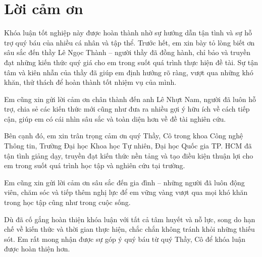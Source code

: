 \chapter*{Lời cảm ơn}
\label{thanks}

Khóa luận tốt nghiệp này được hoàn thành nhờ sự hướng dẫn tận tình và sự hỗ trợ quý báu của nhiều cá nhân và tập thể. Trước hết, em xin bày tỏ lòng biết ơn sâu sắc đến thầy Lê Ngọc Thành – người thầy đã đồng hành, chỉ bảo và truyền đạt những kiến thức quý giá cho em trong suốt quá trình thực hiện đề tài. Sự tận tâm và kiên nhẫn của thầy đã giúp em định hướng rõ ràng, vượt qua những khó khăn, thử thách để hoàn thành tốt nhiệm vụ của mình.

Em cũng xin gửi lời cảm ơn chân thành đến anh Lê Nhựt Nam, người đã luôn hỗ trợ, chia sẻ các kiến thức mới cũng như đưa ra nhiều gợi ý hữu ích về cách tiếp cận, giúp em có cái nhìn sâu sắc và toàn diện hơn về đề tài nghiên cứu.

Bên cạnh đó, em xin trân trọng cảm ơn quý Thầy, Cô trong khoa Công nghệ Thông tin, Trường Đại học Khoa học Tự nhiên, Đại học Quốc gia TP. HCM đã tận tình giảng dạy, truyền đạt kiến thức nền tảng và tạo điều kiện thuận lợi cho em trong suốt quá trình học tập và nghiên cứu tại trường.

Em cũng xin gửi lời cảm ơn sâu sắc đến gia đình – những người đã luôn động viên, chăm sóc và tiếp thêm nghị lực để em vững vàng vượt qua mọi khó khăn trong học tập cũng như trong cuộc sống.

Dù đã cố gắng hoàn thiện khóa luận với tất cả tâm huyết và nỗ lực, song do hạn chế về kiến thức và thời gian thực hiện, chắc chắn không tránh khỏi những thiếu sót. Em rất mong nhận được sự góp ý quý báu từ quý Thầy, Cô để khóa luận được hoàn thiện hơn.